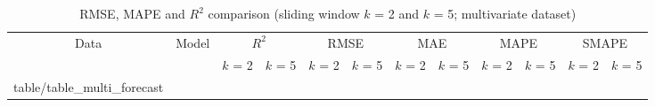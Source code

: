 \documentclass[smallcondensed, natbib]{svjour3}     %
\makeatletter
\newcommand\primitiveinput[1]
		{\@@input #1 }
\makeatother
\begin{document}
{%



\begin{table}[h]
	\caption{RMSE, MAPE and $R^2$ comparison (sliding window $k$ = 2 and $k$ = 5; multivariate dataset)}
	\label{table:multi_forecast}
	\centering
	\begin{adjustbox}{width=\textwidth}
		\begin{tabular}{| c | c | c | c | c | c | c | c | c | c | c | c |}%
			\hline
			\multirow{2}{*}{Data} & \multirow{2}{*}{Model} & \multicolumn{2}{c|}{$R^2$} & \multicolumn{2}{c|}{RMSE} & \multicolumn{2}{c|}{MAE} & \multicolumn{2}{c|}{MAPE}  & \multicolumn{2}{c|}{SMAPE} \\ \cline{3-12}
   				& & $k$ = 2 & $k$ = 5 & $k$ = 2 & $k$ = 5 & $k$ = 2 & $k$ = 5 & $k$ = 2 & $k$ = 5 & $k$ = 2 & $k$ = 5 \\ [0.5ex] 
			\hline
			\primitiveinput{table/table_multi_forecast}
			\hline
		\end{tabular}
	\end{adjustbox}
\end{table}


}
\end{document}
